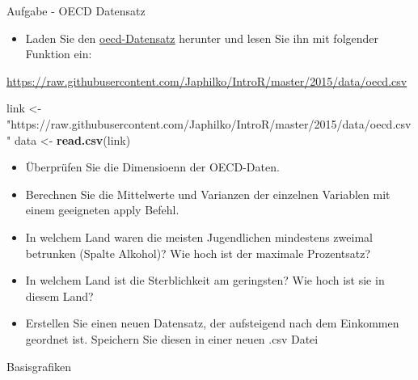 \documentclass[ignorenonframetext,]{beamer}
\newenvironment{Shaded}{}{}
\newcommand{\KeywordTok}[1]{\textcolor[rgb]{0.00,0.44,0.13}{\textbf{{#1}}}}
\newcommand{\StringTok}[1]{\textcolor[rgb]{0.25,0.44,0.63}{{#1}}}
\newcommand{\NormalTok}[1]{{#1}}
\providecommand{\tightlist}{%
\setlength{\itemsep}{0pt}\setlength{\parskip}{0pt}}
\begin{document}
\begin{frame}[fragile]{Aufgabe - OECD Datensatz}

\begin{itemize}
\tightlist
\item
  Laden Sie den
  \href{https://raw.githubusercontent.com/Japhilko/IntroR/master/2015/data/oecd.csv}{oecd-Datensatz}
  herunter und lesen Sie ihn mit folgender Funktion ein:
\end{itemize}

\url{https://raw.githubusercontent.com/Japhilko/IntroR/master/2015/data/oecd.csv}

\begin{Shaded}
\begin{Highlighting}[]
\NormalTok{link <-}\StringTok{ "https://raw.githubusercontent.com/Japhilko/IntroR/master/2015/data/oecd.csv"}
\NormalTok{data <-}\StringTok{ }\KeywordTok{read.csv}\NormalTok{(link)}
\end{Highlighting}
\end{Shaded}

\begin{itemize}
\item
  Überprüfen Sie die Dimensioenn der OECD-Daten.
\item
  Berechnen Sie die Mittelwerte und Varianzen der einzelnen Variablen
  mit einem geeigneten apply Befehl.
\item
  In welchem Land waren die meisten Jugendlichen mindestens zweimal
  betrunken (Spalte Alkohol)? Wie hoch ist der maximale Prozentsatz?
\item
  In welchem Land ist die Sterblichkeit am geringsten? Wie hoch ist sie
  in diesem Land?
\item
  Erstellen Sie einen neuen Datensatz, der aufsteigend nach dem
  Einkommen geordnet ist. Speichern Sie diesen in einer neuen .csv Datei
\end{itemize}

\end{frame}

\begin{frame}{Basisgrafiken}

\end{frame}
\end{document}
